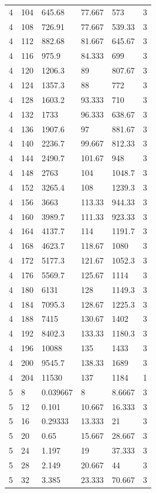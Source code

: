 \begin{tabular}{|p{0.6cm}|p{0.5cm}|p{1.15cm}|p{1cm}|p{1cm}|p{0.7cm}|}
4 & 104 & 645.68 & 77.667 & 573 & 3 \\
4 & 108 & 726.91 & 77.667 & 539.33 & 3 \\
4 & 112 & 882.68 & 81.667 & 645.67 & 3 \\
4 & 116 & 975.9 & 84.333 & 699 & 3 \\
4 & 120 & 1206.3 & 89 & 807.67 & 3 \\
4 & 124 & 1357.3 & 88 & 772 & 3 \\
4 & 128 & 1603.2 & 93.333 & 710 & 3 \\
4 & 132 & 1733 & 96.333 & 638.67 & 3 \\
4 & 136 & 1907.6 & 97 & 881.67 & 3 \\
4 & 140 & 2236.7 & 99.667 & 812.33 & 3 \\
4 & 144 & 2490.7 & 101.67 & 948 & 3 \\
4 & 148 & 2763 & 104 & 1048.7 & 3 \\
4 & 152 & 3265.4 & 108 & 1239.3 & 3 \\
4 & 156 & 3663 & 113.33 & 944.33 & 3 \\
4 & 160 & 3989.7 & 111.33 & 923.33 & 3 \\
4 & 164 & 4137.7 & 114 & 1191.7 & 3 \\
4 & 168 & 4623.7 & 118.67 & 1080 & 3 \\
4 & 172 & 5177.3 & 121.67 & 1052.3 & 3 \\
4 & 176 & 5569.7 & 125.67 & 1114 & 3 \\
4 & 180 & 6131 & 128 & 1149.3 & 3 \\
4 & 184 & 7095.3 & 128.67 & 1225.3 & 3 \\
4 & 188 & 7415 & 130.67 & 1402 & 3 \\
4 & 192 & 8402.3 & 133.33 & 1180.3 & 3 \\
4 & 196 & 10088 & 135 & 1433 & 3 \\
4 & 200 & 9545.7 & 138.33 & 1689 & 3 \\
4 & 204 & 11530 & 137 & 1184 & 1 \\
5 & 8 & 0.039667 & 8 & 8.6667 & 3 \\
5 & 12 & 0.101 & 10.667 & 16.333 & 3 \\
5 & 16 & 0.29333 & 13.333 & 21 & 3 \\
5 & 20 & 0.65 & 15.667 & 28.667 & 3 \\
5 & 24 & 1.197 & 19 & 37.333 & 3 \\
5 & 28 & 2.149 & 20.667 & 44 & 3 \\
5 & 32 & 3.385 & 23.333 & 70.667 & 3 \\

\end{tabular}

